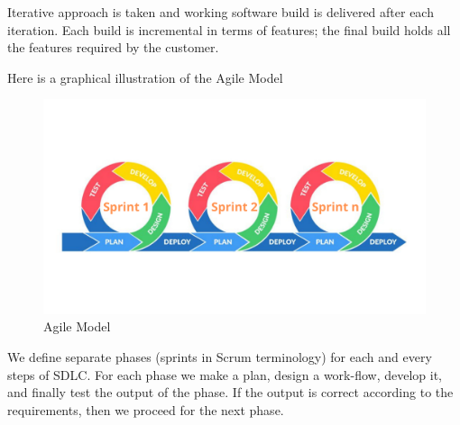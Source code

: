 Iterative approach is taken and working software build is delivered after each iteration. Each build is incremental in terms of features; the final build holds all the features required by the customer.


Here is a graphical illustration of the Agile Model 
\begin{figure}[H]
    \centering
    \includegraphics[width=1\textwidth]{images/agile}
    \caption{Agile Model}
    \label{fig:agile}
\end{figure}
We define separate phases (sprints in Scrum terminology) for each and every steps of SDLC. For each phase we make a plan, design a work-flow, develop it, and finally test the output of the phase. If the output is correct according to the requirements, then we proceed for the next phase.\\

